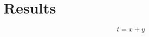 \documentclass[../main.tex]{subfiles}
\begin{document}
 

\chapter{Results} \label{ch:results}

   
 
    
    \begin{equation} \label{eq:svdfgwe}
        t = x + y
    \end{equation}
    
 
    
    
\end{document}

